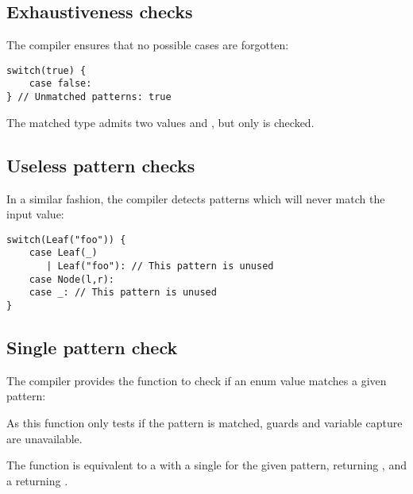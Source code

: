 \subsection{Exhaustiveness checks}
\label{lf-pattern-matching-exhaustiveness}

The compiler ensures that no possible cases are forgotten:

\begin{lstlisting}
switch(true) {
    case false:
} // Unmatched patterns: true
\end{lstlisting}

The matched type  admits two values  and , but only  is checked.




\subsection{Useless pattern checks}
\label{lf-pattern-matching-unused}

In a similar fashion, the compiler detects patterns which will never match the input value:

\begin{lstlisting}
switch(Leaf("foo")) {
    case Leaf(_)
       | Leaf("foo"): // This pattern is unused
    case Node(l,r):
    case _: // This pattern is unused
}
\end{lstlisting}



\subsection{Single pattern check}
\label{lf-pattern-matching-single}

The compiler provides the function  to check if an enum value matches a given pattern:


As this function only tests if the pattern is matched, guards and variable capture are unavailable.

The  function is equivalent to a  with a single  for the given pattern, returning , and a  returning .


